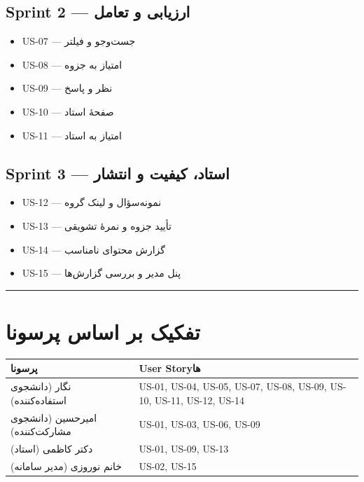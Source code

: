 \documentclass[12pt, a4paper]{article}
\begin{document}
\subsection{Sprint 2 — ارزیابی و تعامل}

\begin{itemize}
\tightlist
\item
  US-07 — جست‌وجو و فیلتر
\item
  US-08 — امتیاز به جزوه
\item
  US-09 — نظر و پاسخ
\item
  US-10 — صفحهٔ استاد
\item
  US-11 — امتیاز به استاد
\end{itemize}

\subsection{Sprint 3 — استاد، کیفیت و انتشار}

\begin{itemize}
\tightlist
\item
  US-12 — نمونه‌سؤال و لینک گروه
\item
  US-13 — تأیید جزوه و نمرهٔ تشویقی
\item
  US-14 — گزارش محتوای نامناسب
\item
  US-15 — پنل مدیر و بررسی گزارش‌ها
\end{itemize}

\begin{center}\rule{0.5\linewidth}{0.5pt}\end{center}

\section{تفکیک بر اساس پرسونا}

{\def\LTcaptype{none} %
\begin{longtable}[]{@{}
  >{\raggedright\arraybackslash}p{}
  >{\raggedright\arraybackslash}p{}@{}}
\toprule\noalign{}
\begin{minipage}[b]{\linewidth}\raggedright
پرسونا
\end{minipage} & \begin{minipage}[b]{\linewidth}\raggedright
User Storyها
\end{minipage} \\
\midrule\noalign{}
\endhead
\bottomrule\noalign{}
\endlastfoot
نگار (دانشجوی استفاده‌کننده) & US-01, US-04, US-05, US-07, US-08, US-09, US-10, US-11, US-12, US-14 \\
امیرحسین (دانشجوی مشارکت‌کننده) & US-01, US-03, US-06, US-09 \\
دکتر کاظمی (استاد) & US-01, US-09, US-13 \\
خانم نوروزی (مدیر سامانه) & US-02, US-15 \\
\end{longtable}
}
\end{document}
